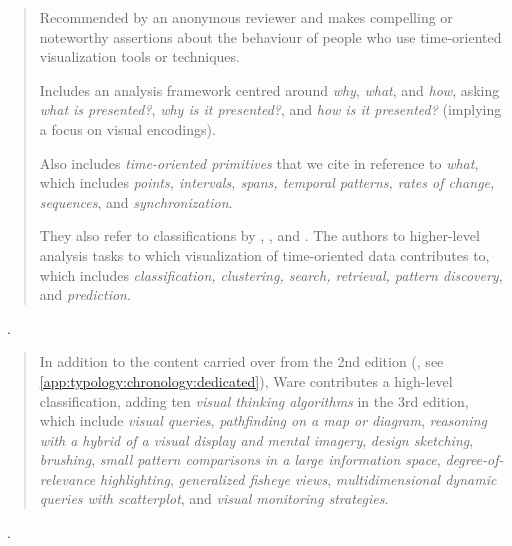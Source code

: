 \begin{quotation}
    Recommended by an anonymous reviewer and makes compelling or noteworthy assertions about the behaviour of people who use time-oriented visualization tools or techniques.
    
    Includes an analysis framework centred around {\it why}, {\it what}, and {\it how}, asking {\it what is presented?}, {\it why is it presented?}, and {\it how is it presented?} (implying a focus on visual encodings).
    
    Also includes {\it time-oriented primitives} that we cite in reference to {\it what}, which includes {\it points, intervals, spans, temporal patterns, rates of change, sequences}, and {\it synchronization}.
    
    They also refer to classifications by \citet{Andrienko2006}, \citet{Spence2007}, and \citet{Yi2007}. 
    The authors to higher-level analysis tasks to which visualization of time-oriented data contributes to, which includes {\it classification, clustering, search, retrieval, pattern discovery}, and {\it prediction}.
\end{quotation}

\begin{sloppypar}
~\cite{Ware2012}. \end{sloppypar}

\begin{quotation}
    In addition to the content carried over from the 2nd edition (\citet{Ware2004}, see \autoref{app:typology:chronology:dedicated}), Ware contributes a high-level classification, adding ten {\it visual thinking algorithms} in the 3rd edition, which include {\it visual queries}, {\it pathfinding on a map or diagram}, {\it reasoning with a hybrid of a visual display and mental imagery}, {\it design sketching}, {\it brushing}, {\it small pattern comparisons in a large information space}, {\it degree-of-relevance highlighting}, {\it generalized fisheye views}, {\it multidimensional dynamic queries with scatterplot}, and {\it visual monitoring strategies}.
\end{quotation}

\begin{sloppypar}
~\cite{Andrienko2006}. \end{sloppypar}

